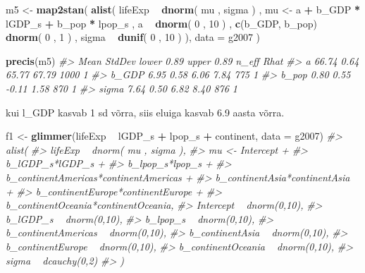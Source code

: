 \documentclass[]{book}
\newenvironment{Shaded}{\begin{snugshade}}{\end{snugshade}}
\newcommand{\CommentTok}[1]{\textcolor[rgb]{0.56,0.35,0.01}{\textit{#1}}}
\newcommand{\DataTypeTok}[1]{\textcolor[rgb]{0.13,0.29,0.53}{#1}}
\newcommand{\DecValTok}[1]{\textcolor[rgb]{0.00,0.00,0.81}{#1}}
\newcommand{\KeywordTok}[1]{\textcolor[rgb]{0.13,0.29,0.53}{\textbf{#1}}}
\newcommand{\NormalTok}[1]{#1}
\newcommand{\OperatorTok}[1]{\textcolor[rgb]{0.81,0.36,0.00}{\textbf{#1}}}
\newcommand{\StringTok}[1]{\textcolor[rgb]{0.31,0.60,0.02}{#1}}
\begin{document}
\begin{Shaded}
\begin{Highlighting}[]
\NormalTok{m5 <-}\StringTok{ }\KeywordTok{map2stan}\NormalTok{(}
    \KeywordTok{alist}\NormalTok{(}
\NormalTok{        lifeExp }\OperatorTok{~}\StringTok{ }\KeywordTok{dnorm}\NormalTok{( mu , sigma ) ,}
\NormalTok{        mu <-}\StringTok{ }\NormalTok{a }\OperatorTok{+}\StringTok{ }\NormalTok{b_GDP }\OperatorTok{*}\StringTok{ }\NormalTok{lGDP_s }\OperatorTok{+}\StringTok{ }\NormalTok{b_pop }\OperatorTok{*}\StringTok{ }\NormalTok{lpop_s ,}
\NormalTok{        a }\OperatorTok{~}\StringTok{ }\KeywordTok{dnorm}\NormalTok{( }\DecValTok{0}\NormalTok{ , }\DecValTok{10}\NormalTok{ ) ,}
        \KeywordTok{c}\NormalTok{(b_GDP, b_pop) }\OperatorTok{~}\StringTok{ }\KeywordTok{dnorm}\NormalTok{( }\DecValTok{0}\NormalTok{ , }\DecValTok{1}\NormalTok{ ) ,}
\NormalTok{        sigma }\OperatorTok{~}\StringTok{ }\KeywordTok{dunif}\NormalTok{( }\DecValTok{0}\NormalTok{ , }\DecValTok{10}\NormalTok{ )}
\NormalTok{), }\DataTypeTok{data =}\NormalTok{ g2007 )}
\end{Highlighting}
\end{Shaded}

\begin{Shaded}
\begin{Highlighting}[]
\KeywordTok{precis}\NormalTok{(m5)}
\CommentTok{#>        Mean StdDev lower 0.89 upper 0.89 n_eff Rhat}
\CommentTok{#> a     66.74   0.64      65.77      67.79  1000    1}
\CommentTok{#> b_GDP  6.95   0.58       6.06       7.84   775    1}
\CommentTok{#> b_pop  0.80   0.55      -0.11       1.58   870    1}
\CommentTok{#> sigma  7.64   0.50       6.82       8.40   876    1}
\end{Highlighting}
\end{Shaded}

kui l\_GDP kasvab 1 sd võrra, siis eluiga kasvab 6.9 aasta võrra.

\begin{Shaded}
\begin{Highlighting}[]
\NormalTok{f1 <-}\StringTok{ }\KeywordTok{glimmer}\NormalTok{(lifeExp }\OperatorTok{~}\StringTok{ }\NormalTok{lGDP_s }\OperatorTok{+}\StringTok{ }\NormalTok{lpop_s }\OperatorTok{+}\StringTok{ }\NormalTok{continent, }\DataTypeTok{data =}\NormalTok{ g2007)}
\CommentTok{#> alist(}
\CommentTok{#>     lifeExp ~ dnorm( mu , sigma ),}
\CommentTok{#>     mu <- Intercept +}
\CommentTok{#>         b_lGDP_s*lGDP_s +}
\CommentTok{#>         b_lpop_s*lpop_s +}
\CommentTok{#>         b_continentAmericas*continentAmericas +}
\CommentTok{#>         b_continentAsia*continentAsia +}
\CommentTok{#>         b_continentEurope*continentEurope +}
\CommentTok{#>         b_continentOceania*continentOceania,}
\CommentTok{#>     Intercept ~ dnorm(0,10),}
\CommentTok{#>     b_lGDP_s ~ dnorm(0,10),}
\CommentTok{#>     b_lpop_s ~ dnorm(0,10),}
\CommentTok{#>     b_continentAmericas ~ dnorm(0,10),}
\CommentTok{#>     b_continentAsia ~ dnorm(0,10),}
\CommentTok{#>     b_continentEurope ~ dnorm(0,10),}
\CommentTok{#>     b_continentOceania ~ dnorm(0,10),}
\CommentTok{#>     sigma ~ dcauchy(0,2)}
\CommentTok{#> )}
\end{Highlighting}
\end{Shaded}
\end{document}
